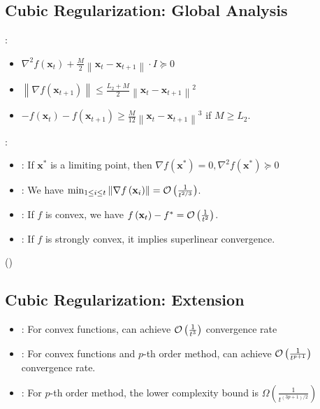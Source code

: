 \subsection*{Cubic Regularization: Global Analysis}
:
\begin{itemize}[leftmargin=*]
    \item $\nabla^{2} f\left(\mathbf{x}_{t}\right)+\frac{M}{2}\left\|\mathbf{x}_{t}-\mathbf{x}_{t+1}\right\| \cdot I \succeq 0$
    \item $\left\|\nabla f\left(\mathbf{x}_{t+1}\right)\right\| \leq \frac{L_{2}+M}{2}\left\|\mathbf{x}_{t}-\mathbf{x}_{t+1}\right\|^{2}$
    \item $-f\left(\mathbf{x}_{t}\right)-f\left(\mathbf{x}_{t+1}\right) \geq \frac{M}{12}\left\|\mathbf{x}_{t}-\mathbf{x}_{t+1}\right\|^{3}$ if $M \geq L_{2}$.
\end{itemize}
:
\begin{itemize}[leftmargin=*]
    \item {}: If $\mathbf{x}^{*}$ is a limiting point, then $\nabla f\left(\mathbf{x}^{*}\right)=0, \nabla^{2} f\left(\mathbf{x}^{*}\right) \succeq 0$
    \item {}: We have $\min _{1 \leq i \leq t}\left\|\nabla f\left(\mathbf{x}_{i}\right)\right\|=\operatorname{\mathcal{O}}\left(\frac{1}{t^{2 / 3}}\right)$.
    \item {}: If $f$ is convex, we have $f\left(\mathbf{x}_{t}\right)-f^{*}=\operatorname{\mathcal{O}}\left(\frac{1}{t^{2}}\right)$.
    \item {}: If $f$ is strongly convex, it implies superlinear convergence.
\end{itemize}
()




\subsection*{Cubic Regularization: Extension}
\begin{itemize}[leftmargin=*]
    \item {}: For convex functions, can achieve $\operatorname{\mathcal{O}}\left(\frac{1}{t^{3}}\right)$ convergence rate
    \item {}: For convex functions and $p$-th order method, can achieve $\operatorname{\mathcal{O}}\left(\frac{1}{t^{p+1}}\right)$ convergence rate.
    \item {}: For $p$-th order method, the lower complexity bound is $\Omega\left(\frac{1}{t^{(3 p+1) / 2}}\right)$
\end{itemize}




